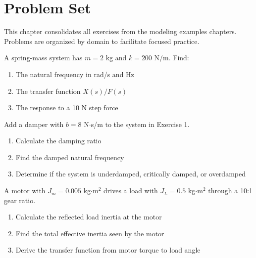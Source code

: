 
\chapter{Problem Set}
\label{ch:problem_set}

This chapter consolidates all exercises from the modeling examples chapters. Problems are organized by domain to facilitate focused practice.



\begin{exercise}
A spring-mass system has $m = 2$ kg and $k = 200$ N/m. Find:
\begin{enumerate}[label=(\alph*)]
    \item The natural frequency in rad/s and Hz
    \item The transfer function $X(s)/F(s)$
    \item The response to a 10 N step force
\end{enumerate}
\end{exercise}

\begin{exercise}
Add a damper with $b = 8$ N$\cdot$s/m to the system in Exercise 1.
\begin{enumerate}[label=(\alph*)]
    \item Calculate the damping ratio
    \item Find the damped natural frequency
    \item Determine if the system is underdamped, critically damped, or overdamped
\end{enumerate}
\end{exercise}

\begin{exercise}
A motor with $J_m = 0.005$ kg$\cdot$m$^2$ drives a load with $J_L = 0.5$ kg$\cdot$m$^2$ through a 10:1 gear ratio.
\begin{enumerate}[label=(\alph*)]
    \item Calculate the reflected load inertia at the motor
    \item Find the total effective inertia seen by the motor
    \item Derive the transfer function from motor torque to load angle
\end{enumerate}
\end{exercise}

